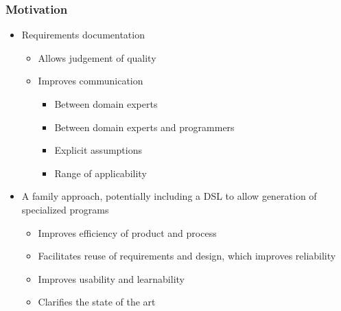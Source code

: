 \documentclass[t,12pt,numbers,fleqn]{beamer}
\begin{document}

\begin{frame}

\frametitle{Motivation}
\begin{itemize}

\item Requirements documentation
\begin{itemize}
\item Allows judgement of quality %
\item Improves communication
\begin{itemize}
\item Between domain experts%
\item Between domain experts and programmers %
\item Explicit assumptions
\item Range of applicability
\end{itemize}
\end{itemize}

\item A family approach, potentially including a DSL to allow generation of specialized programs
\begin{itemize}
\item Improves efficiency of product and process
\item Facilitates reuse of requirements and design, which improves reliability
\item Improves usability and learnability%
\item Clarifies the state of the art
\end{itemize}

\end{itemize}

\end{frame}

\end{document}
